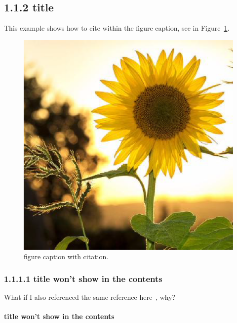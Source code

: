 \documentclass[a4paper,11pt,UTF8,openright]{book}
\begin{document}
\subsection{1.1.2 title}

This example shows how to cite within the figure caption, see in Figure~\ref{fig:captioncitation}.

\begin{figure}[htp]
	\centering
	\includegraphics[width=\textwidth]{flower}
	\caption[figure caption with citation.]{figure caption with citation.~\cite{ibge1993}} 
	\label{fig:captioncitation}
\end{figure}

\subsubsection{1.1.1.1 title won't show in the contents}

What if I also referenced the same reference here~\cite{ibge1993}, why?




\paragraph{title won't show in the contents}
\lipsum[1-5]
\end{document}
